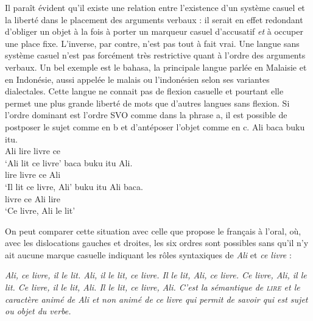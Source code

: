 {    \ea
    \z

    Il paraît évident qu’il existe une relation entre l’existence d’un système casuel et la liberté dans le placement des arguments verbaux : il serait en effet redondant d’obliger un objet à la fois à porter un marqueur casuel d’accusatif \textit{et} à occuper une place fixe. L’inverse, par contre, n’est pas tout à fait vrai. Une langue sans système casuel n’est pas forcément très restrictive quant à l’ordre des arguments verbaux. Un bel exemple est le bahasa, la principale langue parlée en Malaisie et en Indonésie, aussi appelée le malais ou l’indonésien selon ses variantes dialectales. Cette langue ne connait pas de flexion casuelle et pourtant elle permet une plus grande liberté de mots que d’autres langues sans flexion. Si l’ordre dominant est l’ordre SVO comme dans la phrase a, il est possible de postposer le sujet comme en b et d’antéposer l’objet comme en c.
    \ea\label{ex:bahasa}
    \ea
    \gll Ali baca buku itu.\\
    Ali lire    livre  ce\\
    \glt  ‘Ali lit ce livre’
    \ex
    \gll baca buku itu Ali.\\
    lire    livre  ce Ali\\
    \glt  ‘Il lit ce livre, Ali’
    \ex
    \gll buku itu Ali baca.\\
        livre ce Ali lire    \\
    \glt  ‘Ce livre, Ali le lit’
    \z
    \z

    On peut comparer cette situation avec celle que propose le français à l’oral, où, avec les dislocations gauches et droites, les six ordres sont possibles sans qu’il n’y ait aucune marque casuelle indiquant les rôles syntaxiques de \textit{Ali} et \textit{ce livre} :

    \ea
    \ea\itshape {Ali, ce livre, il le lit.}
    \ex\itshape {Ali, il le lit, ce livre.}
    \ex\itshape {Il le lit, Ali, ce livre.}
    \ex\itshape {Ce livre, Ali, il le lit.}
    \ex\itshape {Ce livre, il le lit, Ali.}
    \ex\itshape {Il le lit, ce livre, Ali.}
    \z
    \z
C'est la sémantique de \textsc{lire} et le caractère animé de \textit{Ali} et non animé de \textit{ce livre} qui permit de savoir qui est sujet ou objet du verbe.
}
